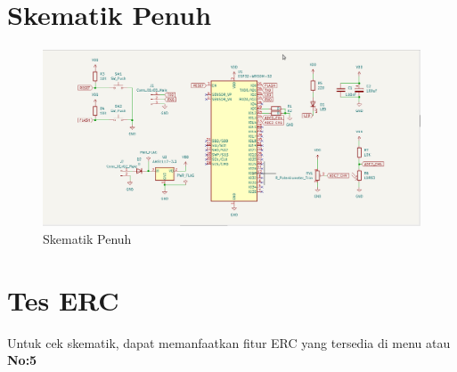 \documentclass[12pt]{book}
\begin{document}
	\newpage
	\section{Skematik Penuh}

	\begin{figure}[!ht]
		\centering
		\includegraphics[width=\textwidth]{images/sch/sch_22}
		\caption{Skematik Penuh}
	\end{figure}

	\section{Tes ERC}

	Untuk cek skematik, dapat memanfaatkan fitur ERC yang tersedia di menu  atau \textbf{No:5}
\end{document}
